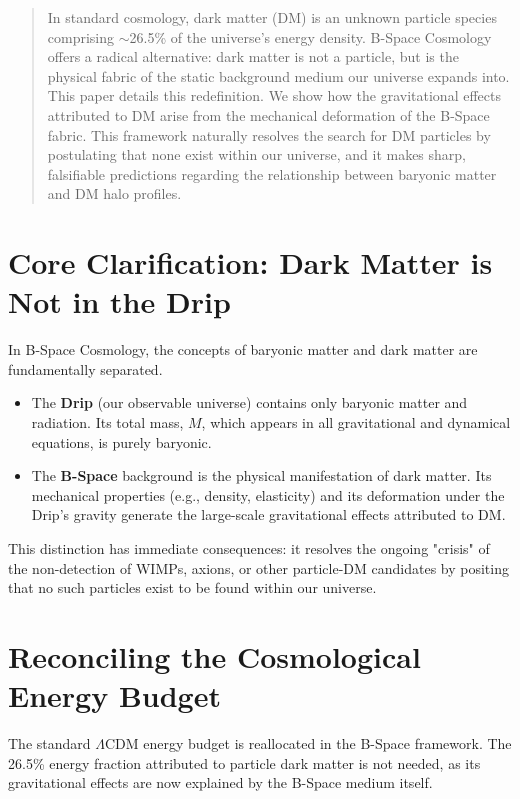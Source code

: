 \documentclass{BSpacePaper} %
\begin{document}
\makeBSCSsupplementtitle

\begin{abstract}
\noindent
In standard cosmology, dark matter (DM) is an unknown particle species comprising $\sim$26.5\% of the universe's energy density. B-Space Cosmology offers a radical alternative: dark matter is not a particle, but is the physical fabric of the static background medium our universe expands into. This paper details this redefinition. We show how the gravitational effects attributed to DM arise from the mechanical deformation of the B-Space fabric. This framework naturally resolves the search for DM particles by postulating that none exist within our universe, and it makes sharp, falsifiable predictions regarding the relationship between baryonic matter and DM halo profiles.
\end{abstract}

\section{Core Clarification: Dark Matter is Not in the Drip}
In B-Space Cosmology, the concepts of baryonic matter and dark matter are fundamentally separated.
\begin{itemize}
    \item The \textbf{Drip} (our observable universe) contains only baryonic matter and radiation. Its total mass, $M$, which appears in all gravitational and dynamical equations, is purely baryonic.
    \item The \textbf{B-Space} background is the physical manifestation of dark matter. Its mechanical properties (e.g., density, elasticity) and its deformation under the Drip's gravity generate the large-scale gravitational effects attributed to DM.
\end{itemize}
This distinction has immediate consequences: it resolves the ongoing "crisis" of the non-detection of WIMPs, axions, or other particle-DM candidates by positing that no such particles exist to be found within our universe.

\section{Reconciling the Cosmological Energy Budget}
The standard \(\Lambda\)CDM energy budget is reallocated in the B-Space framework. The 26.5\% energy fraction attributed to particle dark matter is not needed, as its gravitational effects are now explained by the B-Space medium itself.
\end{document}
